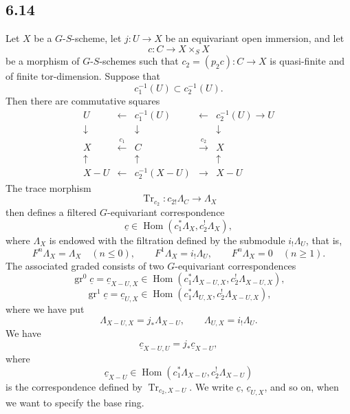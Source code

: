 \documentclass[11pt]{article}
\DeclareMathOperator{\Hom}{Hom}
\providecommand{\Tr}{\operatorname{Tr}}
\providecommand{\Tr}{\operatorname{Tr}}
\providecommand{\Tr}{\operatorname{Tr}}
\providecommand{\Hom}{\operatorname{Hom}}
\providecommand{\Tr}{\operatorname{Tr}}
\begin{document}
\subsection*{6.14}
Let $X$ be a $G$-$S$-scheme, let $j:U\to X$ be an equivariant open immersion, and let
\[
c:C\to X\times_SX
\]
be a morphism of $G$-$S$-schemes such that $c_2=(p_2c):C\to X$ is quasi-finite and of finite tor-dimension. Suppose that
\[
c_1^{-1}(U)\subset c_2^{-1}(U).
\]
Then there are commutative squares
\begin{equation}
\begin{array}{ccccc}
U & \longleftarrow & c_1^{-1}(U) & \longleftarrow & c_2^{-1}(U)\longrightarrow U\\
\downarrow && \downarrow && \downarrow\\
X & \xleftarrow{\,c_1\,} & C & \xrightarrow{\,c_2\,} & X\\
\uparrow && \uparrow && \uparrow\\
X-U & \longleftarrow & c_2^{-1}(X-U) & \longrightarrow & X-U
\end{array}
\tag{6.14.1}
\end{equation}
The trace morphism
\[
\Tr_{c_2}:c_{2!}\Lambda_C\longrightarrow \Lambda_X
\]
then defines a filtered $G$-equivariant correspondence
\begin{equation}
\underline c\in\Hom(c_1^*\Lambda_X,c_2^!\Lambda_X),
\tag{6.14.2}
\end{equation}
where $\Lambda_X$ is endowed with the filtration defined by the submodule $i_!\Lambda_U$, that is,
\[
F^n\Lambda_X=\Lambda_X\quad(n\le0),\qquad
F^1\Lambda_X=i_!\Lambda_U,\qquad
F^n\Lambda_X=0\quad(n\ge1).
\]
The associated graded consists of two $G$-equivariant correspondences
\[
\operatorname{gr}^0\underline c=\underline c_{X-U,X}
\in\Hom(c_1^*\Lambda_{X-U,X},c_2^!\Lambda_{X-U,X}),
\]
\begin{equation}
\operatorname{gr}^1\underline c=\underline c_{U,X}
\in\Hom(c_1^*\Lambda_{U,X},c_2^!\Lambda_{X-U,X}),
\tag{6.14.3}
\end{equation}
where we have put
\[
\Lambda_{X-U,X}=j_*\Lambda_{X-U},\qquad
\Lambda_{U,X}=i_!\Lambda_U.
\]
We have
\begin{equation}
\underline c_{X-U,U}=j_*\underline c_{X-U},
\tag{6.14.4}
\end{equation}
where
\[
\underline c_{X-U}\in\Hom(c_1^*\Lambda_{X-U},c_2^!\Lambda_{X-U})
\]
is the correspondence defined by $\Tr_{c_2,X-U}$. We write $\underline c$, $\underline c_{U,X}$, and so on, when we want to specify the base ring.
\end{document}
